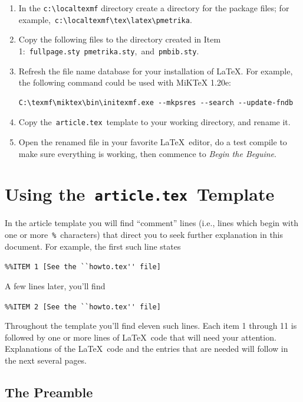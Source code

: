 \documentclass[titlepage,12pt]{article}
\begin{document}
\begin{enumerate}

\item In the \verb=c:\localtexmf= directory create a directory for the
package files; for example,~\verb=c:\localtexmf\tex\latex\pmetrika=.

\item Copy the following files to the directory created in Item
1:\ \texttt{fullpage.sty}\ \texttt{pmetrika.sty},\ and\
\texttt{pmbib.sty}.

\item Refresh the file name database for your installation of
\LaTeX. For example, the following command could be used with
MiKTeX 1.20e:
\begin{verbatim}C:\texmf\miktex\bin\initexmf.exe --mkpsres --search --update-fndb\end{verbatim}

\item Copy the~\texttt{article.tex}~template to your
working directory, and rename it.

\item Open the renamed file in your favorite \LaTeX\ editor, do a test compile to make
sure everything is working, then commence to \textit{Begin the
Beguine}.

\end{enumerate}

\section{Using the~\texttt{\bf article.tex}~Template}\label{template}

In the article template you will find ``comment'' lines
(i.e., lines which begin with one or more~\verb=%=~characters)
that direct you to seek further explanation in this document. For
example, the first such line states
\begin{center}\verb=%%ITEM 1 [See the ``howto.tex'' file]=\end{center}
A few lines later, you'll find
\begin{center}\verb=%%ITEM 2 [See the ``howto.tex'' file]=\end{center}
Throughout the template you'll find eleven such lines. Each item 1
through 11 is followed by one or more lines of \LaTeX\ code that
will need your attention. Explanations of the \LaTeX\ code and the
entries that are needed will follow in the next several pages.


\subsection{The Preamble}
\end{document}
